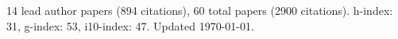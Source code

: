 14 lead author papers (894 citations),
60 total papers (2900 citations).\newline
h-index: 31, g-index: 53, i10-index: 47. Updated \today.